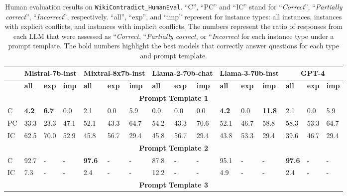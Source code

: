 \begin{table}[t]
   \caption{Human evaluation results on \texttt{WikiContradict\_HumanEval}. ``C'', ``PC'' and ``IC'' stand for ``\emph{Correct}'', ``\emph{Partially correct}'', ``\emph{Incorrect}'', respectively. ``all'', ``exp'', and ``imp'' represent for instance types: all instances, instances with explicit conflicts, and instances with implicit conflicts. The numbers represent the ratio of responses from each LLM that were assessed as ``\emph{Correct}, ``\emph{Partially correct}, or ``\emph{Incorrect} for each instance type under a prompt template. The bold numbers highlight the best models that correctly answer questions for  each type and prompt template.}
   \label{tab:humeval}
    \begin{footnotesize}
    \begin{tabular}{|p{0.25cm}|p{0.46cm}|p{0.475cm}|p{0.46cm}|p{0.46cm}|p{0.475cm}|p{0.46cm}|p{0.46cm}|p{0.46cm}|p{0.46cm}|p{0.46cm}|p{0.475cm}|p{0.46cm}|p{0.46cm}|p{0.475cm}|p{0.46cm}|}
   \hline
        & \multicolumn{3}{c|}{Mistral-7b-inst} & \multicolumn{3}{c|}{Mixtral-8x7b-inst} & \multicolumn{3}{c|}{Llama-2-70b-chat}& \multicolumn{3}{c|}{Llama-3-70b-inst} & \multicolumn{3}{c|}{GPT-4} \\ \hline
        ~ & \textbf{all}  & \textbf{exp}& \textbf{imp} & \textbf{all} & \textbf{exp} & \textbf{imp} & \textbf{all}  & \textbf{exp} & \textbf{imp}& \textbf{all} & \textbf{exp} & \textbf{imp} & \textbf{all}  & \textbf{exp} & \textbf{imp} \\ \hline
        \multicolumn{16}{|c|}{\textbf{Prompt Template 1}} \\ \hline
        C & \textbf{4.2} & \textbf{6.7} & 0.0 & 2.1 & 0.0 & 5.9 & 0.0 & 0.0 & 0.0 & \textbf{4.2} & 0.0 & \textbf{11.8} & 2.1 & 0.0 & 5.9 \\ \hline
        PC & 33.3 & 23.3 & 47.1 & 52.1 & 43.3 & 64.7 & 54.2 & 43.3 & 70.6 & 52.1 & 46.7 & 58.8 & 58.3 & 53.3 & 64.7 \\ \hline
        IC & 62.5 & 70.0 & 52.9 & 45.8 & 56.7 & 29.4 & 45.8 & 56.7 & 29.4 & 43.8 & 53.3 & 29.4 & 39.6 & 46.7 & 29.4 \\ \hline
        \multicolumn{16}{|c|}{\textbf{Prompt Template 2}}\\ \hline
        C & 92.7 & - & - & \textbf{97.6} & - & - & 87.8 & - & - & 95.1 & - & - & \textbf{97.6} & - & - \\ \hline
        IC & 7.3 & - & - & 2.4 & - & - & 12.2 & - & - & 4.9 & - & - & 2.4 & - & - \\ \hline
        \multicolumn{16}{|c|}{\textbf{Prompt Template 3}}\\ \hline

\end{tabular}
\end{footnotesize}
\end{table}
